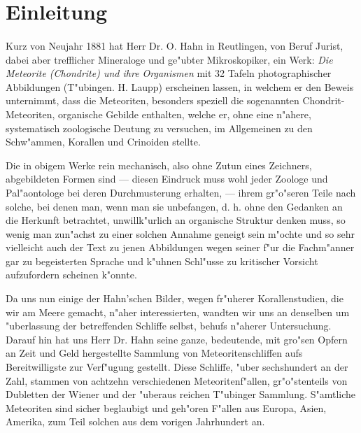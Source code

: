 \documentclass[a4paper, 11pt, oneside]{article}
\begin{document}
\section*{Einleitung}
\paragraph{}
Kurz von Neujahr 1881 hat Herr Dr. O. Hahn in Reutlingen, von Beruf Jurist, dabei aber trefflicher Mineraloge und ge"ubter Mikroskopiker, ein Werk: \emph{Die Meteorite (Chondrite) und ihre Organismen} mit 32 Tafeln photographischer Abbildungen (T"ubingen. H. Laupp) erscheinen lassen, in welchem er den Beweis unternimmt, dass die Meteoriten, besonders speziell die sogenannten Chondrit-Meteoriten, organische Gebilde enthalten, welche er, ohne eine n"ahere, systematisch zoologische Deutung zu versuchen, im Allgemeinen zu den Schw"ammen, Korallen und Crinoiden stellte.

Die in obigem Werke rein mechanisch, also ohne Zutun eines Zeichners, abgebildeten Formen sind --- diesen Eindruck muss wohl jeder Zoologe und Pal"aontologe bei deren Durchmusterung erhalten, --- ihrem gr"o"seren Teile nach solche, bei denen man, wenn man sie unbefangen, d. h. ohne den Gedanken an die Herkunft betrachtet, unwillk"urlich an organische Struktur denken muss, so wenig man zun"achst zu einer solchen Annahme geneigt sein m"ochte und so sehr vielleicht auch der Text zu jenen Abbildungen wegen seiner f"ur die Fachm"anner gar zu begeisterten Sprache und k"uhnen Schl"usse zu kritischer Vorsicht aufzufordern scheinen k"onnte.

Da uns nun einige der Hahn'schen Bilder, wegen fr"uherer Korallenstudien, die wir am Meere gemacht, n"aher interessierten, wandten wir uns an denselben um "uberlassung der betreffenden Schliffe selbst, behufs n"aherer Untersuchung. Darauf hin hat uns Herr Dr. Hahn seine ganze, bedeutende, mit gro"sen Opfern an Zeit und Geld hergestellte Sammlung von Meteoritenschliffen aufs Bereitwilligste zur Verf"ugung gestellt. Diese Schliffe, "uber sechshundert an der Zahl, stammen von achtzehn verschiedenen Meteoritenf"allen, gr"o"stenteils von Dubletten der Wiener und der "uberaus reichen T"ubinger Sammlung. S"amtliche Meteoriten sind sicher beglaubigt und geh"oren F"allen aus Europa, Asien, Amerika, zum Teil solchen aus dem vorigen Jahrhundert an.
\end{document}
